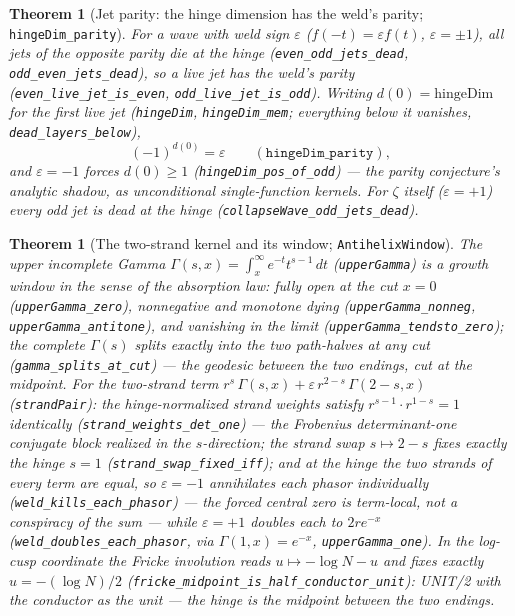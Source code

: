 \documentclass[11pt]{article}
\newtheorem{theorem}[definition]{Theorem}
\newcommand{\code}[1]{\texttt{#1}}
\begin{document}
\begin{theorem}[Jet parity: the hinge dimension has the weld's parity; \code{hingeDim\_parity}]\label{thm:jetparity}
For a wave with weld sign $\varepsilon$ ($f(-t)=\varepsilon f(t)$, $\varepsilon=\pm1$), all jets of
the opposite parity die at the hinge (\code{even\_odd\_jets\_dead}, \code{odd\_even\_jets\_dead}),
so a live jet has the weld's parity (\code{even\_live\_jet\_is\_even}, \code{odd\_live\_jet\_is\_odd}).
Writing $d(0)=\mathrm{hingeDim}$ for the first live jet (\code{hingeDim}, \code{hingeDim\_mem};
everything below it vanishes, \code{dead\_layers\_below}),
\[
  (-1)^{d(0)}=\varepsilon \qquad(\code{hingeDim\_parity}),
\]
and $\varepsilon=-1$ forces $d(0)\ge1$ (\code{hingeDim\_pos\_of\_odd}) --- the parity conjecture's
analytic shadow, as unconditional single-function kernels.  For $\zeta$ itself ($\varepsilon=+1$)
every odd jet is dead at the hinge (\code{collapseWave\_odd\_jets\_dead}).
\end{theorem}

\begin{theorem}[The two-strand kernel and its window; \code{AntihelixWindow}]\label{thm:twostrand}
The upper incomplete Gamma $\Gamma(s,x)=\int_x^\infty e^{-t}t^{s-1}\,dt$ (\code{upperGamma}) is a
growth window in the sense of the absorption law: fully open at the cut $x=0$
(\code{upperGamma\_zero}), nonnegative and monotone dying (\code{upperGamma\_nonneg},
\code{upperGamma\_antitone}), and vanishing in the limit (\code{upperGamma\_tendsto\_zero}); the
complete $\Gamma(s)$ splits exactly into the two path-halves at any cut
(\code{gamma\_splits\_at\_cut}) --- the geodesic between the two endings, cut at the midpoint.  For
the two-strand term $r^{s}\,\Gamma(s,x)+\varepsilon\,r^{2-s}\,\Gamma(2-s,x)$ (\code{strandPair}):
the hinge-normalized strand weights satisfy $r^{s-1}\cdot r^{1-s}=1$ identically
(\code{strand\_weights\_det\_one}) --- the Frobenius determinant-one conjugate block realized in
the $s$-direction; the strand swap $s\mapsto2-s$ fixes exactly the hinge $s=1$
(\code{strand\_swap\_fixed\_iff}); and at the hinge the two strands of \emph{every} term are equal,
so $\varepsilon=-1$ annihilates each phasor individually
(\code{weld\_kills\_each\_phasor}) --- the forced central zero is term-local, not a conspiracy of
the sum --- while $\varepsilon=+1$ doubles each to $2re^{-x}$ (\code{weld\_doubles\_each\_phasor},
via $\Gamma(1,x)=e^{-x}$, \code{upperGamma\_one}).  In the log-cusp coordinate the Fricke
involution reads $u\mapsto-\log N-u$ and fixes exactly $u=-(\log N)/2$
(\code{fricke\_midpoint\_is\_half\_conductor\_unit}): UNIT/2 with the conductor as the unit --- the
hinge is the midpoint between the two endings.
\end{theorem}
\end{document}
